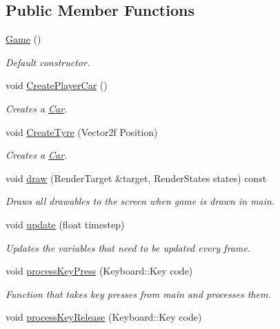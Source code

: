 \subsection*{Public Member Functions}
\begin{DoxyCompactItemize}
\item 
\hyperlink{class_game_ad59df6562a58a614fda24622d3715b65}{Game} ()
\begin{DoxyCompactList}\small\item\em Default constructor. \end{DoxyCompactList}\item 
void \hyperlink{class_game_a79853b667c44be836272528805943168}{Create\+Player\+Car} ()
\begin{DoxyCompactList}\small\item\em Creates a \hyperlink{class_car}{Car}. \end{DoxyCompactList}\item 
void \hyperlink{class_game_adf56462c5f8473018fad9b25cc5af607}{Create\+Tyre} (Vector2f Position)
\begin{DoxyCompactList}\small\item\em Creates a \hyperlink{class_car}{Car}. \end{DoxyCompactList}\item 
void \hyperlink{class_game_a260c4d5123eb3a51cbd0bb685546cef4}{draw} (Render\+Target \&target, Render\+States states) const 
\begin{DoxyCompactList}\small\item\em Draws all drawables to the screen when game is drawn in main. \end{DoxyCompactList}\item 
void \hyperlink{class_game_acc8519c7ced1cf9eb9bbb3a2f325f6a0}{update} (float timestep)
\begin{DoxyCompactList}\small\item\em Updates the variables that need to be updated every frame. \end{DoxyCompactList}\item 
void \hyperlink{class_game_ad3053e3b15bbcb049dc040801d58be7c}{process\+Key\+Press} (Keyboard\+::\+Key code)
\begin{DoxyCompactList}\small\item\em Function that takes key presses from main and processes them. \end{DoxyCompactList}\item 
void \hyperlink{class_game_adb2ea3b70e0038d2caceedfde3bfc663}{process\+Key\+Release} (Keyboard\+::\+Key code)

\end{DoxyCompactItemize}

